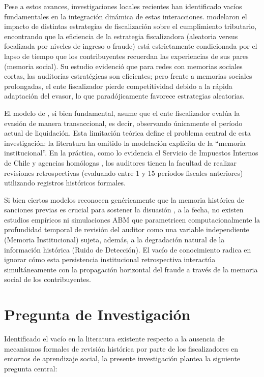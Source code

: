 \documentclass[twocolumn,10pt,letterpaper]{article}
\begin{document}
Pese a estos avances, investigaciones locales recientes han identificado vacíos fundamentales en la integración dinámica de estas interacciones. \textcite{canessa2025tax} modelaron el impacto de distintas estrategias de fiscalización sobre el cumplimiento tributario, encontrando que la eficiencia de la estrategia fiscalizadora (aleatoria versus focalizada por niveles de ingreso o fraude) está estrictamente condicionada por el lapso de tiempo que los contribuyentes recuerdan las experiencias de sus pares (memoria social). Su estudio evidenció que para redes con memorias sociales cortas, las auditorías estratégicas son eficientes; pero frente a memorias sociales prolongadas, el ente fiscalizador pierde competitividad debido a la rápida adaptación del evasor, lo que paradójicamente favorece estrategias aleatorias.

El modelo de \textcite{canessa2025tax}, si bien fundamental, asume que el ente fiscalizador evalúa la evasión de manera transaccional, es decir, observando únicamente el período actual de liquidación. Esta limitación teórica define el problema central de esta investigación: la literatura ha omitido la modelación explícita de la ``memoria institucional''. En la práctica, como lo evidencia el Servicio de Impuestos Internos de Chile y agencias homólogas \parencite{macdonald2026institutional}, los auditores tienen la facultad de realizar revisiones retrospectivas (evaluando entre 1 y 15 períodos fiscales anteriores) utilizando registros históricos formales. 

Si bien ciertos modelos reconocen genéricamente que la memoria histórica de sanciones previas es crucial para sostener la disuasión \parencite{antunes2005tax, bloomquist2004multi, hashimzade2018using}, a la fecha, no existen estudios empíricos ni simulaciones ABM que parametricen computacionalmente la profundidad temporal de revisión del auditor como una variable independiente (Memoria Institucional) sujeta, además, a la degradación natural de la información histórica (Ruido de Detección). El vacío de conocimiento radica en ignorar cómo esta persistencia institucional retrospectiva interactúa simultáneamente con la propagación horizontal del fraude a través de la memoria social de los contribuyentes. 

\section{Pregunta de Investigación}

Identificado el vacío en la literatura existente respecto a la ausencia de mecanismos formales de revisión histórica por parte de los fiscalizadores en entornos de aprendizaje social, la presente investigación plantea la siguiente pregunta central:
\end{document}
